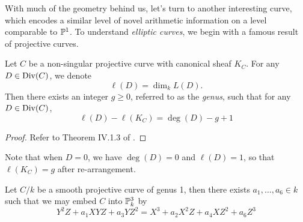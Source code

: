 With much of the geometry behind us,
let's turn to another interesting curve,
which encodes a similar level of novel arithmetic information on a level comparable to $\mathbb{P}^1$.
To understand \textit{elliptic curves},
we begin with a famous result of projective curves.


\begin{theorem}
    Let $C$ be a non-singular projective curve with canonical sheaf $K_C$.
    For any $D \in {\rm Div}(C)$,
    we denote
    \[
        \ell(D) = \dim_k L(D).
    \]
    Then there exists an integer $g \geq 0$,
    referred to as the \textit{genus},
    such that for any $D \in {\rm Div}(C)$,
    \[
        \ell(D) - \ell(K_C)
        = \deg(D) - g + 1
    \]
\end{theorem}

\begin{proof}
    Refer to Theorem IV.1.3 of \cite{Hartshorne_2013}.
\end{proof}

Note that when $D = 0$, we have $\deg(D) = 0$ and $\ell(D) = 1$,
so that $\ell(K_C) = g$ after re-arrangement.

\begin{proposition}
    Let $C/k$ be a smooth projective curve of genus 1, 
    then there exists $a_1, \ldots, a_6 \in k$ such that we may embed $C$ into $\mathbb{P}_k^3$ by
    \[
        Y^2Z + a_1 XYZ + a_3 YZ^2
        = X^3 + a_2 X^2 Z + a_4 X Z^2 + a_6 Z^3
    \]
\end{proposition}

